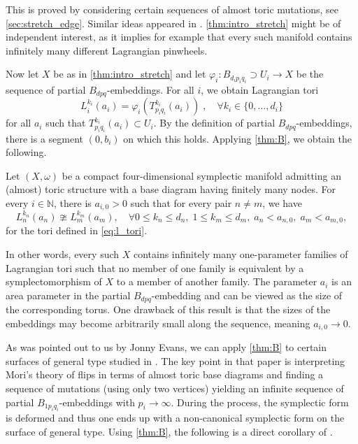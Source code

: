 \documentclass[12pt,a4paper,abstract=true,draft]{scrartcl}
\begin{document}
This is proved by considering certain sequences of almost toric mutations, see \cref{sec:stretch_edge}.
Similar ideas appeared in \cite{EvaUrz21}.
\cref{thm:intro_stretch} might be of independent interest, as it implies for example that every such manifold contains infinitely many different Lagrangian pinwheels. 

Now let $X$ be as in \cref{thm:intro_stretch} and let $\varphi_i \colon B_{d_i p_i q_i} \supset U_i \rightarrow X$ be the sequence of partial $B_{dpq}$-embeddings.
For all $i$, we obtain Lagrangian tori
\begin{equation}
    \label{eq:l_tori}
    L^{k_i}_i(a_i) = \varphi_i(T^{k_i}_{p_i q_i}(a_i))\;, \quad
    \forall k_i \in \{0,\ldots,d_i\}
\end{equation}
for all $a_i$ such that $T^{k_i}_{p_i q_i}(a_i) \subset U_i$.
By the definition of partial $B_{dpq}$-embeddings, there is a segment $(0,b_i)$ on which this holds.
Applying \cref{thm:B}, we obtain the following. 
   

\begin{maintheorem}
    \label{thm:C}
    Let $(X,\omega)$ be a compact four-dimensional symplectic manifold admitting an (almost) toric structure with a base diagram having finitely many nodes.
For every $i \in \mathbb{N}$, there is $a_{i,0} > 0$ such that for every pair $n \neq m$, we have
    \begin{equation}
        L^{k_n}_n(a_n) \ncong L^{k_m}_m(a_m), \quad
        \forall 0 ≤ k_n ≤ d_n,\; 1 ≤ k_m ≤ d_m, \; a_n < a_{n,0}, \; a_m < a_{m,0},
    \end{equation}
    for the tori defined in \eqref{eq:l_tori}.
\end{maintheorem}

In other words, every such $X$ contains infinitely many one-parameter families of Lagrangian tori such that no member of one family is equivalent by a symplectomorphism of $X$ to a member of another family.
The parameter $a_i$ is an area parameter in the partial $B_{dpq}$-embedding and can be viewed as the size of the corresponding torus.
One drawback of this result is that the sizes of the embeddings may become arbitrarily small along the sequence, meaning $a_{i,0} \rightarrow 0$. 

As was pointed out to us by Jonny Evans, we can apply \cref{thm:B} to certain surfaces of general type studied in \cite{EvaUrz21}.
The key point in that paper is interpreting Mori's theory of flips in terms of almost toric base diagrams and finding a sequence of mutations (using only two vertices) yielding an infinite sequence of partial $B_{1p_iq_i}$-embeddings with $p_i \rightarrow \infty$.
During the process, the symplectic form is deformed and thus one ends up with a non-canonical symplectic form on the surface of general type.
Using \cref{thm:B}, the following is a direct corollary of \cite[Theorem 1.1]{EvaUrz21}.
\end{document}
